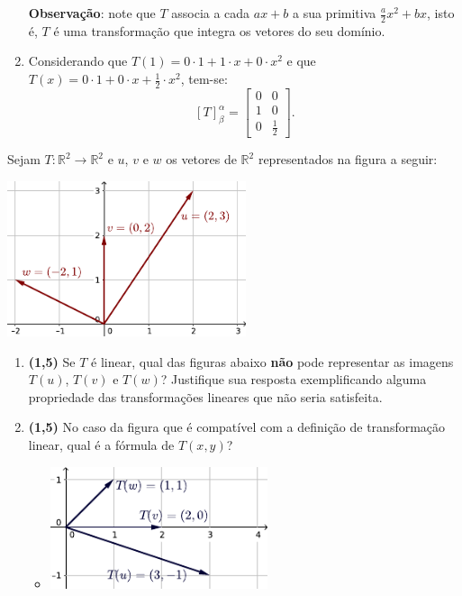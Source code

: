 \documentclass[12pt,a4paper]{article}
\newcommand*\R{\mathbb{R}}
\begin{document}
\begin{ExerciseList}
\begin{enumerate}
\textbf{Observação}: note que $T$ associa a cada $ax+b$ a sua primitiva $\frac{a}{2}x^2 + bx$, isto é, $T$ é uma transformação que integra os vetores do seu domínio.

\item Considerando que $T(1) = 0 \cdot 1 + 1 \cdot x + 0 \cdot x^2$ e que $T(x) = 0 \cdot 1 + 0 \cdot x + \frac{1}{2} \cdot x^2$, tem-se:
\[
[T]^\alpha_\beta
= \begin{bmatrix}
0 & 0\\
1 & 0\\
0 & \frac{1}{2}
\end{bmatrix}.
\]
\end{enumerate}

\Exercise%
Sejam $T: \R^2 \to \R^2$ e $u$, $v$ e $w$ os vetores de $\R^2$ representados na figura a seguir:
\begin{center}
\includegraphics[width=7.0cm]{img/prova-3-nex-vetores-dom}
\end{center}
\begin{enumerate}
\item \textbf{(1,5)} Se $T$ é linear, qual das figuras abaixo \textbf{não} pode representar as imagens $T(u)$, $T(v)$ e $T(w)$? Justifique sua resposta exemplificando alguma propriedade das transformações lineares que não seria satisfeita.
\item \textbf{(1,5)} No caso da figura que é compatível com a definição de transformação linear, qual é a fórmula de $T(x,y)$?
\begin{multicols}{2}
\begin{itemize}
\item[] \includegraphics[width=6.4cm]{img/prova-3-nex-vetores-img1}

\end{itemize}
\end{multicols}
\end{enumerate}
\end{ExerciseList}
\end{document}

